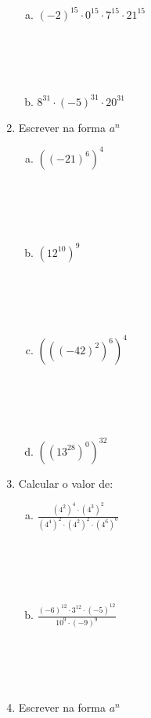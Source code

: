 \documentclass[a4paper,14pt]{article}
\begin{document}
\begin{multicols}{2}
\begin{enumerate}
\begin{enumerate}[a)]
    			\item $(-2)^{15} \cdot 0^{15} \cdot 7^{15} \cdot 21^{15}$ \\\\\\\\\\
    			\item $8^{31} \cdot (-5)^{31} \cdot 20^{31}$
    		\end{enumerate}
    		\item Escrever na forma $a^n$
    		\begin{enumerate}[a)]
    			\item $((-21)^6)^4$ \\\\\\\\\\
    			\item $(12^{10})^9$  \\\\\\\\\\
    			\item $(((-42)^{2})^{6})^{4}$ \\\\\\\\\\
    			\item $((13^{28})^{0})^{32}$ \newpage
    		\end{enumerate}
    		\item Calcular o valor de:
    		\begin{enumerate}[a)]
    			\item $\frac{(4^2)^{4} \cdot (4^3)^{2}}{(4^4)^{2} \cdot (4^2)^{2} \cdot (4^6)^{0}}$ \\\\\\\\\\
    			\item $\frac{(-6)^{12} \cdot 3^{12} \cdot (-5)^{12}}{10^9 \cdot (-9)^9}$ \\\\\\\\\\
    		\end{enumerate}
    		\item Escrever na forma $a^n$
    		\begin{enumerate}[a)]

\end{enumerate}
\end{enumerate}
\end{multicols}
\end{document}
